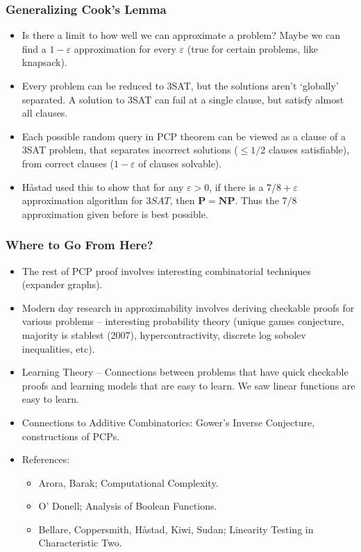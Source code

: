 \documentclass{beamer}
\begin{document}
\begin{frame}
    \frametitle{Generalizing Cook's Lemma}

    \begin{itemize}
        \item Is there a limit to how well we can approximate a problem? Maybe we can find a $1 - \varepsilon$ approximation for every $\varepsilon$ (true for certain problems, like knapsack).

        \item Every problem can be reduced to 3SAT, but the solutions aren't `globally' separated. A solution to 3SAT can fail at a single clause, but satisfy almost all clauses.

        \item Each possible random query in PCP theorem can be viewed as a clause of a 3SAT problem, that separates incorrect solutions ($\leq 1/2$ clauses satisfiable), from correct clauses ($1 - \varepsilon$ of clauses solvable).

        \item H\r{a}stad used this to show that for any $\varepsilon > 0$, if there is a $7/8 + \varepsilon$ approximation algorithm for $3SAT$, then $\mathbf{P} = \mathbf{NP}$. Thus the $7/8$ approximation given before is best possible.
    \end{itemize}
\end{frame}

\begin{frame}
    \frametitle{Where to Go From Here?}

    \begin{itemize}
        \item The rest of PCP proof involves interesting combinatorial techniques (expander graphs).

        \item Modern day research in approximability involves deriving checkable proofs for various problems -- interesting probability theory (unique games conjecture, majority is stablest (2007), hypercontractivity, discrete log sobolev inequalities, etc).

        \item Learning Theory -- Connections between problems that have quick checkable proofs and learning models that are easy to learn. We saw linear functions are easy to learn.

        \item Connections to Additive Combinatorics: Gower's Inverse Conjecture, constructions of PCPs.

        \item References:
        \begin{itemize}
            \item Arora, Barak; Computational Complexity.
            \item O' Donell; Analysis of Boolean Functions.
            \item Bellare, Coppersmith, H\r{a}stad, Kiwi, Sudan; Linearity Testing in Characteristic Two.
        \end{itemize}
    \end{itemize}
\end{frame}
\end{document}
